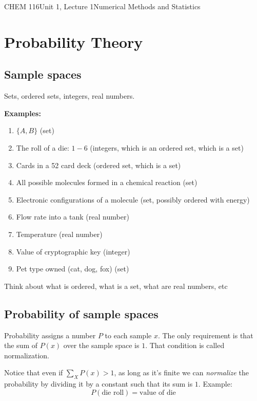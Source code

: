 \documentclass{article}
\begin{document}
\begin{tdoc}{CHEM 116}{Unit 1, Lecture 1}{Numerical Methods and Statistics}
\begin{enumerate}
\end{enumerate}

\section{Probability Theory}

\subsection{Sample spaces}

Sets, ordered sets, integers, real numbers. 

{\bf Examples:}
\begin{enumerate}

\item $\{A, B\}$ (set)
\item The roll of a die: $1-6$ (integers, which is an ordered set, which is a set)
\item Cards in a 52 card deck (ordered set, which is a set)
\item All possible molecules formed in a chemical reaction (set)
\item Electronic configurations of a molecule (set, possibly ordered with energy)
\item Flow rate into a tank (real number)
\item Temperature (real number)
\item Value of cryptographic key (integer)
\item Pet type owned (cat, dog, fox) (set)

\end{enumerate}

Think about what is ordered, what is a set, what are real numbers, etc

\subsection{Probability of sample spaces}
Probability assigns a number $P$ to each sample $x$. The only
requirement is that the sum of $P(x)$ over the sample space is
$1$. That condition is called normalization.

Notice that even if $\sum_{X} P(x) > 1$, as long as it's finite we can
\emph{normalize} the probability by dividing it by a constant such
that its sum is $1$. Example: 
\begin{equation}
P(\textrm{die roll}) = \textrm{value of die}
\end{equation}


\end{tdoc}
\end{document}
